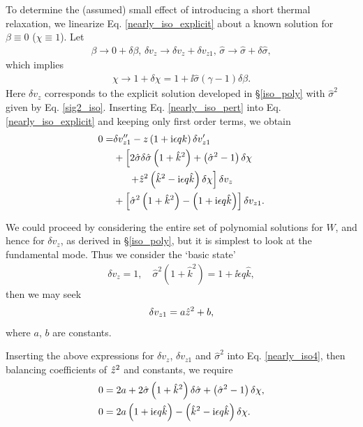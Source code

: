 To determine the (assumed) small effect of introducing a short thermal
relaxation, we linearize Eq. \ref{nearly_iso_explicit} about a known 
solution for $\beta\equiv0$  ($\chi\equiv 1$). 
Let 
\begin{align}\label{nearly_iso_pert}
  \beta \to 0 + \delta\beta,\, \delta v_z\to \delta v_z+\delta
  v_{z1},\,\hat{\sigma} \to \hat{\sigma} + \delta\hat{\sigma}, 
\end{align}
which implies 
\begin{align}
  \chi \to 1 + \delta\chi = 1 + \ii \hat{\sigma}\left(\gamma-1\right)\delta\beta.
\end{align}
Here $\delta v_z$ corresponds to the explicit solution developed in
\S\ref{iso_poly} with  $\hat{\sigma}^2$ given by Eq. \ref{sig2_iso}. Inserting
Eq. \ref{nearly_iso_pert} into Eq. \ref{nearly_iso_explicit}  and keeping
only first order terms, we obtain 
\begin{align}
 0 =& \delta v_{z1}^{\prime\prime} - z\left(1 + \mathrm{i}\epsilon q
   k\right)\delta v_{z1}^\prime\notag\\
 &+ \left[2\hat{\sigma}\delta\hat{\sigma}\left(1 + \hat{k}^2\right) +
   \left(\hat{\sigma}^2 - 1\right)\delta\chi \right.\notag\\
&\phantom{++} \left. + \hat{z}^2\left(\hat{k}^2 -
     \mathrm{i}\epsilon q \hat{k}\right)\delta\chi\right]\delta v_z\notag\\
 &+\left[\hat{\sigma}^2\left(1 + \hat{k}^2\right) - \left(1+\mathrm{i}\epsilon
     q \hat{k}\right)\right]\delta v_{z1}.\label{nearly_iso4}
\end{align}

We could proceed by considering the entire set of polynomial solutions
for $W$, and hence for $\delta v_z$, as derived in \S\ref{iso_poly}, but it
is simplest to look at the fundamental mode. Thus we consider the `basic state' 
 \begin{align*}
   \delta v_z = 1,\quad \hat{\sigma}^2\left(1+\hat{k}^2\right) = 1 +
   \ii\epsilon q \hat{k},
 \end{align*}
 then we may seek 
 \begin{align}
   \delta v_{z1} = a \hat{z}^2 + b,
 \end{align}
where $a$, $b$ are constants. 

Inserting the above expressions for $\delta v_z$, $\delta v_{z1}$ and
$\hat{\sigma}^2$ into Eq. \ref{nearly_iso4}, then balancing
coefficients of $\hat{z}^2$ and constants, we require
\begin{align}
0 &= 2a + 2\hat{\sigma}\left(1+\hat{k}^2\right)\delta\hat{\sigma} +
\left(\hat{\sigma}^2 -1\right)\delta\chi,\notag\\
0&= 2a\left(1+\mathrm{i}\epsilon q \hat{k}\right) - \left(\hat{k}^2 - \mathrm{i}\epsilon
q \hat{k}\right)\delta\chi.
\end{align} 

